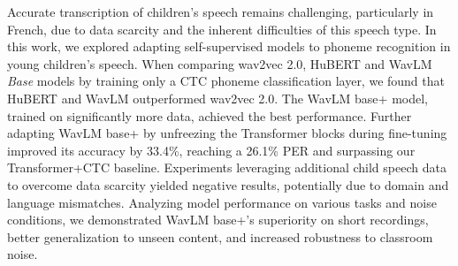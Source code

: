 \documentclass{Interspeech2024}
\begin{document}
Accurate transcription of children's speech remains challenging, particularly in French, due to data scarcity and the inherent difficulties of this speech type. In this work, we explored adapting self-supervised models to phoneme recognition in young children's speech. 
When comparing wav2vec 2.0, HuBERT and WavLM \textit{Base} models by training only a CTC phoneme classification layer, we found that HuBERT and WavLM outperformed wav2vec 2.0. The WavLM base+ model, trained on significantly more data, achieved the best performance.
Further adapting WavLM base+ by unfreezing the Transformer blocks during fine-tuning improved its accuracy by 33.4\%, reaching a 26.1\% PER and surpassing our Transformer+CTC baseline.
Experiments leveraging additional child speech data to overcome data scarcity yielded negative results, potentially due to domain and language mismatches.
Analyzing model performance on various tasks and noise conditions, we demonstrated WavLM base+'s superiority on short recordings, better generalization to unseen content, and increased robustness to classroom noise.







\end{document}
